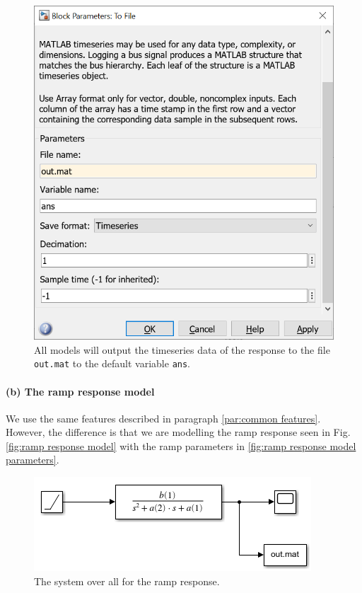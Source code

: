 \documentclass[12pt]{article}
\begin{document}
\begin{figure}[h]
    \centering
    \includegraphics[width=(5in/689)*688]{common_to_file.png}
    \caption{All models will output the timeseries data of the response to the file \texttt{out.mat} to the default variable \texttt{ans}.}
    \label{fig:common to file}
\end{figure}

\paragraph{(b) The ramp response model}

We use the same features described in paragraph \ref{par:common features}.
However, the difference is that we are modelling the ramp response seen in Fig. \ref{fig:ramp response model}
with the ramp parameters in \ref{fig:ramp response model parameters}.

\begin{figure}[h]
    \centering
    \includegraphics[width=\linewidth]{part01b_ramp_response_model.png}
    \caption{The system over all for the ramp response.}
    \label{fig:ramp response model system}
\end{figure}
\end{document}
